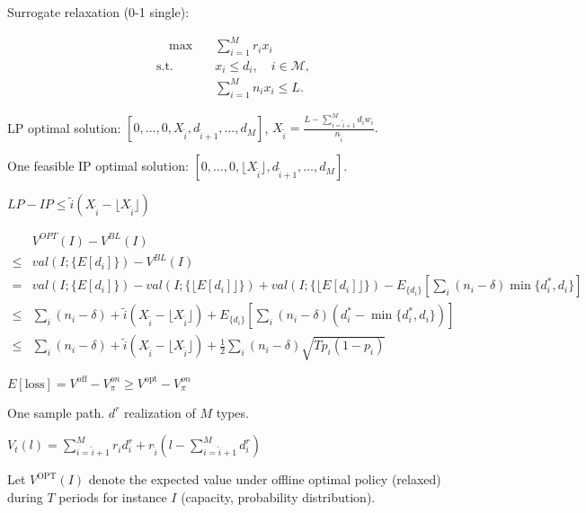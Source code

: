 
Surrogate relaxation (0-1 single):

\begin{align}\label{one_row}
    \quad \max \quad & \sum_{i = 1}^{M} r_i x_{i} \\
    \text {s.t.} \quad & x_{i} \leq d_{i}, \quad i \in \mathcal{M},  \\ 
    & \sum_{i=1}^{M} n_{i} x_{i} \leq L.
\end{align}

LP optimal solution: $[0, \ldots, 0, X_{\tilde{i}}, d_{\tilde{i}+1}, \ldots, d_{M}]$, $X_{\tilde{i}} = \frac{L - \sum_{i = \tilde{i}+1}^{M} {d_i w_i}}{n_{\tilde{i}}}.$

One feasible IP optimal solution: $[0, \ldots, 0, \lfloor X_{\tilde{i}} \rfloor, d_{\tilde{i}+1}, \ldots, d_{M}]$.

$LP - IP \leq \tilde{i} (X_{\tilde{i}} - \lfloor X_{\tilde{i}} \rfloor)$


\begin{align*}
    & V^{OPT}(I) - V^{BL}(I) \\
 \leq & val(I; \{E[d_{i}]\}) - V^{BL}(I) \\
 = & val(I; \{E[d_{i}]\}) - val(I; \{\lfloor E[d_{i}]\rfloor\}) + val(I; \{\lfloor E[d_{i}]\rfloor\}) - E_{\{d_{i}\}}[\sum_{i} (n_{i}-\delta) \min\{d_{i}^{*}, d_{i}\}] \\
 \leq & \sum_{i} (n_{i} - \delta) + \tilde{i} (X_{\tilde{i}} - \lfloor X_{\tilde{i}} \rfloor) + E_{\{d_{i}\}}[\sum_{i} (n_{i}-\delta) (d_{i}^{*} - \min\{d_{i}^{*}, d_{i}\})] \\
 \leq & \sum_{i} (n_{i} - \delta) + \tilde{i} (X_{\tilde{i}} - \lfloor X_{\tilde{i}} \rfloor) + \frac{1}{2} \sum_{i} (n_{i}-\delta) \sqrt{T p_{i} (1- p_{i})}
 \end{align*}
 


$E[\text{loss}] = V^{\text{off}} - V_{\pi}^{on} \geq V^{\text{opt}} - V_{\pi}^{on}$

One sample path. $d^{r}$ realization of $M$ types. 

$V_{t}(l) = \sum_{i = \hat{i}+1}^{M} r_{i} d_{i}^{r} + r_{\hat{i}}(l- \sum_{i= \hat{i}+1}^{M} d_{i}^{r})$


Let $V^{\text{OPT}}(I)$ denote the expected value under offline optimal policy (relaxed) during $T$ periods for instance $I$ (capacity, probability distribution).

